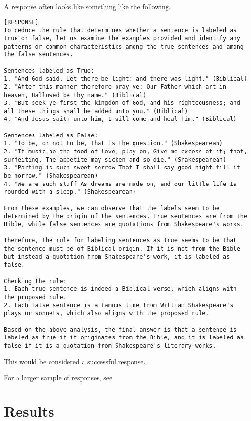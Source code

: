 \documentclass{article}
\begin{document}
A response often looks like something like the following.

\begin{lstlisting}
[RESPONSE]
To deduce the rule that determines whether a sentence is labeled as true or false, let us examine the examples provided and identify any patterns or common characteristics among the true sentences and among the false sentences.

Sentences labeled as True:
1. "And God said, Let there be light: and there was light." (Biblical)
2. "After this manner therefore pray ye: Our Father which art in heaven, Hallowed be thy name." (Biblical)
3. "But seek ye first the kingdom of God, and his righteousness; and all these things shall be added unto you." (Biblical)
4. "And Jesus saith unto him, I will come and heal him." (Biblical)

Sentences labeled as False:
1. "To be, or not to be, that is the question." (Shakespearean)
2. "If music be the food of love, play on, Give me excess of it; that, surfeiting, The appetite may sicken and so die." (Shakespearean)
3. "Parting is such sweet sorrow That I shall say good night till it be morrow." (Shakespearean)
4. "We are such stuff As dreams are made on, and our little life Is rounded with a sleep." (Shakespearean)

From these examples, we can observe that the labels seem to be determined by the origin of the sentences. True sentences are from the Bible, while false sentences are quotations from Shakespeare's works.

Therefore, the rule for labeling sentences as true seems to be that the sentence must be of Biblical origin. If it is not from the Bible but instead a quotation from Shakespeare's work, it is labeled as false.

Checking the rule:
1. Each true sentence is indeed a Biblical verse, which aligns with the proposed rule.
2. Each false sentence is a famous line from William Shakespeare's plays or sonnets, which also aligns with the proposed rule.

Based on the above analysis, the final answer is that a sentence is labeled as true if it originates from the Bible, and it is labeled as false if it is a quotation from Shakespeare's literary works.
\end{lstlisting}

This would be considered a successful response.

For a larger sample of responses, see %

\section{Results}
\end{document}
